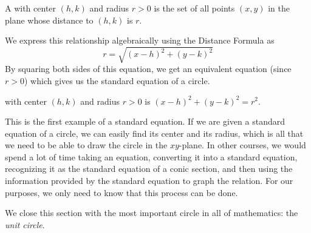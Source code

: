 \documentclass[nooutcomes]{ximera}
\begin{document}
\begin{definition}
A  with center $(h,k)$ and radius $r > 0$ is the set of all points $(x, y)$ in the plane whose distance to $(h,k)$ is $r$. 
\end{definition} 

\begin{image}
\end{image}

We  express this relationship algebraically using the Distance Formula as 
\[r = \sqrt{(x - h)^2 + (y-k)^2}\]  
By squaring both sides of this equation, we get an equivalent equation (since $r > 0$) which gives us the standard equation of a circle.

\begin{definition}   with center $(h,k)$ and radius $r >0$ is $(x-h)^2 + (y-k)^2 = r^2.$
\end{definition}

This is the first example of a standard equation. If we are given a standard equation of a circle, we can easily find its center and its radius, which is all that we need to be able to draw the circle in the $xy$-plane. In other courses, we would spend a lot of time taking an equation, converting it into a standard equation, recognizing it as the standard equation of a conic section, and then using the information provided by the standard equation to graph the relation. For our purposes, we only need to know that this process can be done. 

We close this section with the most important circle in all of mathematics:  the \emph{unit circle}.
\end{document}
